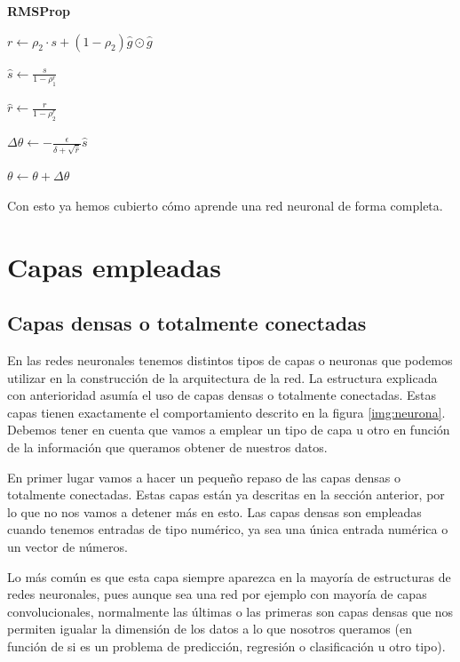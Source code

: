 \begin{itemize}
\begin{algorithm}[H]{\Large{\textbf{RMSProp}}}
{			$r\leftarrow \rho_2 \cdot s + (1-\rho_2)\hat{g}\odot \hat{g}$
			
			$\hat{s}\leftarrow \frac{s}{1-\rho_1^r}$
			
			$\hat{r}\leftarrow \frac{r}{1-\rho_2^r}$
			
			$\Delta \theta \leftarrow - \frac{\epsilon}{\delta + \sqrt{\hat{r}}}\hat{s}$
			
			$\theta \leftarrow \theta + \Delta \theta$
			
		}
		
		\vspace{10px}
		
		
		\vspace{5px}
	\end{algorithm}
\end{itemize}

Con esto ya hemos cubierto cómo aprende una red neuronal de forma completa.

\section{Capas empleadas}

\subsection{Capas densas o totalmente conectadas}

En las redes neuronales tenemos distintos tipos de capas o neuronas que podemos utilizar en la construcción de la arquitectura de la red. La estructura explicada con anterioridad asumía el uso de capas densas o totalmente conectadas. Estas capas tienen exactamente el comportamiento descrito en la figura \ref{img:neurona}. Debemos tener en cuenta que vamos a emplear un tipo de capa u otro en función de la información que queramos obtener de nuestros datos.

En primer lugar vamos a hacer un pequeño repaso de las capas densas o totalmente conectadas. Estas capas están ya descritas en la sección anterior, por lo que no nos vamos a detener más en esto. Las capas densas son empleadas cuando tenemos entradas de tipo numérico, ya sea una única entrada numérica o un vector de números. 

Lo más común es que esta capa siempre aparezca en la mayoría de estructuras de redes neuronales, pues aunque sea una red por ejemplo con mayoría de capas convolucionales, normalmente las últimas o las primeras son capas densas que nos permiten igualar la dimensión de los datos a lo que nosotros queramos (en función de si es un problema de predicción, regresión o clasificación u otro tipo).

